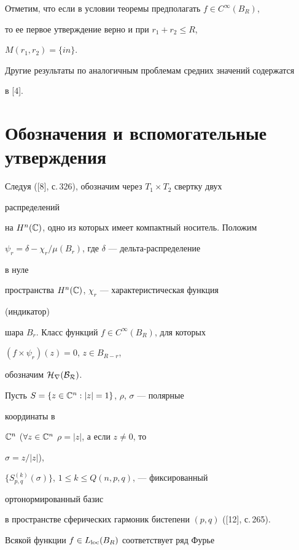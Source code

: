 


Отметим, что если в условии теоремы предполагать $f\in 


C^\infty(B_R)$, 


то ее первое утверждение верно и при $r_1+r_2\le R$, 


$M(r_1,r_2)=\{in\}$. 


Другие результаты по аналогичным проблемам средних значений содержатся 


в [4]. 


 


\section{Обозначения и вспомогательные утверждения} 


 


Следуя ([8], с.\,326), обозначим через $T_1\times T_2$ свертку двух 


распределений 


на $H^n(\Bbb C)$, одно из которых имеет компактный носитель. Положим 


$\psi_r=\delta-\chi_r/\mu(B_r)$, где $\delta$ --- дельта-распределение 


в нуле 


пространства $H^n(\Bbb C)$, $\chi_r$ --- характеристическая функция 


(индикатор) 


шара $B_r$. Класс функций $f\in C^\infty(B_R)$, для которых 


$(f\times\psi_r)(z)=0$, $z\in B_{R-r}$, 


обозначим $\cal H_r(B_R)$. 


 


Пусть $S=\{z\in\Bbb C^n:|z|=1\}$, $\rho$, $\sigma$ --- полярные 


координаты в 


$\Bbb C^n$ ($\forall z\in\Bbb C^n$\; $\rho=|z|$, а если $z\ne0$, то 


$\sigma=z/|z|$), 


$\{S^{(k)}_{p,q}(\sigma)\}$, $1\le k\le Q(n,p,q)$, --- фиксированный 


ортонормированный базис 


в пространстве сферических гармоник бистепени $(p,q)$ ([12], с.\,265). 


Всякой функции $f\in L_{\operatorname{loc}}(B_R)$ соответствует ряд Фурье 


